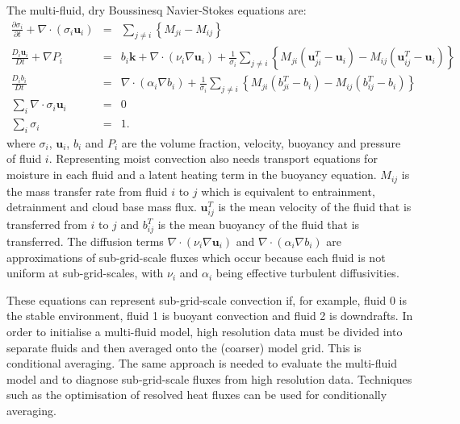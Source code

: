 \documentclass[11pt,a4paper]{article}
\begin{document}
The multi-fluid, dry Boussinesq Navier-Stokes equations \cite[approximated by][]{WMS20} are:
\begin{eqnarray}
\frac{\partial\sigma_{i}}{\partial t}+\nabla\cdot(\sigma_{i}\mathbf{u}_{i}) & = & {\textstyle\sum}_{j\ne i}\left\{ M_{ji}-M{}_{ij}\right\} \label{eq:sigma}\\
\frac{D_{i}\mathbf{u}_{i}}{Dt}+\nabla P_{i} & = & b_{i}\mathbf{k}+\nabla\cdot\left( \nu_i\nabla\mathbf{u}_{i}\right)+\frac{1}{\sigma_{i}}{\textstyle\sum}_{j\ne i}\left\{ M_{ji}\left(\mathbf{u}_{ji}^{T}-\mathbf{u}_{i}\right)-M_{ij}\left(\mathbf{u}_{ij}^{T}-\mathbf{u}_{i}\right)\right\} \label{eq:mom}\\
\frac{D_{i}b_{i}}{Dt} & = & \nabla\cdot \left(\alpha_i \nabla b_{i}\right)+\frac{1}{\sigma_{i}}{\textstyle\sum}_{j\ne i}\left\{ M_{ji}\left(b_{ji}^{T}-b_{i}\right)-M_{ij}\left(b_{ij}^{T}-b_{i}\right)\right\} \label{eq:b}\\
{\textstyle\sum}_{i}\nabla\cdot\sigma_{i}\mathbf{u}_{i} & = & 0\label{eq:divFree}\\
{\textstyle\sum}_{i}\sigma_{i} & = & 1.\label{eq:sumOne}
\end{eqnarray}
where $\sigma_i$, $\mathbf{u}_i$, $b_i$ and $P_i$ are the volume fraction, velocity, buoyancy and pressure of fluid $i$. Representing moist convection also needs transport equations for moisture in each fluid and a latent heating term in the buoyancy equation. $M_{ij}$ is the mass transfer rate from fluid $i$ to $j$ which is equivalent to entrainment, detrainment and cloud base mass flux. $\mathbf{u}_{ij}^T$ is the mean velocity of the fluid that is transferred from $i$ to $j$ and $b_{ij}^T$ is the mean buoyancy of the fluid that is transferred. The diffusion terms $\nabla\cdot\left( \nu_i\nabla\mathbf{u}_{i}\right)$ and $\nabla\cdot \left(\alpha_i \nabla b_{i}\right)$ are approximations of sub-grid-scale fluxes which occur because each fluid is not uniform at sub-grid-scales, with $\nu_i$ and $\alpha_i$ being effective turbulent diffusivities.

These equations can represent sub-grid-scale convection if, for example, fluid 0 is the stable environment, fluid 1 is buoyant convection and fluid 2 is downdrafts. In order to initialise a multi-fluid model, high resolution data must be divided into separate fluids and then averaged onto the (coarser) model grid. This is conditional averaging. The same approach is needed to evaluate the multi-fluid model and to diagnose sub-grid-scale fluxes from high resolution data. Techniques such as the optimisation of resolved heat fluxes \cite[]{efstathiou2019b} can be used for conditionally averaging.
\end{document}
